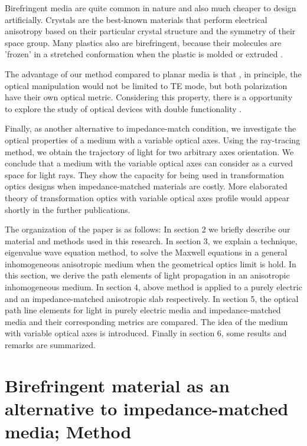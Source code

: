 \documentclass[9pt,twocolumn,twoside]{osajnl}
\begin{document}
Birefringent media are quite common in nature and also much cheaper to design artificially. Crystals are the best-known materials that perform electrical anisotropy based on their particular crystal structure and the symmetry of their space group. Many plastics also are birefringent, because their molecules are 'frozen' in a stretched conformation when the plastic is molded or extruded \cite{PEN}. 
 
The advantage of our method compared to planar media is that , in principle, the optical manipulation would not be limited to TE mode, but both polarization have their own optical metric. Considering this property, there is a opportunity to explore the study of optical devices with double functionality \cite{}.
 
 Finally, as another alternative to impedance-match condition, we investigate the optical properties of a medium with a variable optical axes. Using the ray-tracing method, we obtain the trajectory of light  for two arbitrary axes orientation. We conclude that a medium with the variable optical axes can consider as a curved space for light rays. They show the capacity for being used in transformation optics designs when impedance-matched materials are costly. More elaborated theory of transformation optics with variable optical axes profile would appear shortly in the further publications.

The organization of the paper is as follows: In section 2 we briefly describe our material and methods used in this research. In section 3, we explain a technique, eigenvalue wave equation method,  to solve the Maxwell equations in a general inhomogeneous anisotropic medium when the geometrical optics limit is hold. In this section, we derive the path elements of light propagation in an anisotropic inhomogeneous medium. 
In section 4, above method is applied to a purely electric and an impedance-matched anisotropic slab respectively. 
In section 5, the optical path line elements for light in purely electric media and impedance-matched media and their corresponding metrics are compared. The idea of the medium with variable optical axes is introduced. 
Finally in section 6, some results and remarks are summarized. 

\section{Birefringent material as an alternative to impedance-matched media; Method}
\end{document}
